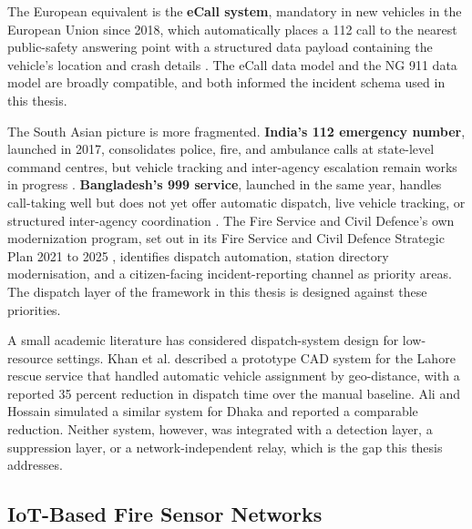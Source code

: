 The European equivalent is the \textbf{eCall system}, mandatory in new vehicles in the European Union since 2018, which automatically places a 112 call to the nearest public-safety answering point with a structured data payload containing the vehicle's location and crash details \cite{ecall2018}. The eCall data model and the NG 911 data model are broadly compatible, and both informed the incident schema used in this thesis.

The South Asian picture is more fragmented. \textbf{India's 112 emergency number}, launched in 2017, consolidates police, fire, and ambulance calls at state-level command centres, but vehicle tracking and inter-agency escalation remain works in progress \cite{india1122022}. \textbf{Bangladesh's 999 service}, launched in the same year, handles call-taking well but does not yet offer automatic dispatch, live vehicle tracking, or structured inter-agency coordination \cite{bangladesh9992018}. The Fire Service and Civil Defence's own modernization program, set out in its Fire Service and Civil Defence Strategic Plan 2021 to 2025 \cite{fscd2021strategic}, identifies dispatch automation, station directory modernisation, and a citizen-facing incident-reporting channel as priority areas. The dispatch layer of the framework in this thesis is designed against these priorities.

A small academic literature has considered dispatch-system design for low-resource settings. Khan et al. \cite{khan2022cad} described a prototype CAD system for the Lahore rescue service that handled automatic vehicle assignment by geo-distance, with a reported 35 percent reduction in dispatch time over the manual baseline. Ali and Hossain \cite{ali2023dispatch} simulated a similar system for Dhaka and reported a comparable reduction. Neither system, however, was integrated with a detection layer, a suppression layer, or a network-independent relay, which is the gap this thesis addresses.

\subsection{IoT-Based Fire Sensor Networks}

